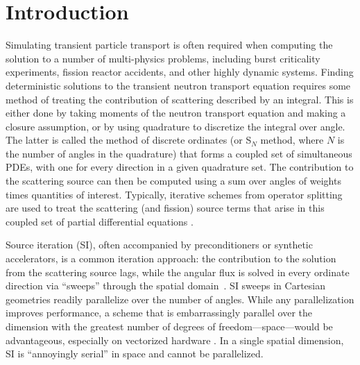 \section{Introduction}




Simulating transient particle transport is often required when computing the solution to a number of multi-physics problems, including burst criticality experiments, fission reactor accidents, and other highly dynamic systems.
Finding deterministic solutions to the transient neutron transport equation requires some method of treating the contribution of scattering described by an integral.
This is either done by taking moments of the neutron transport equation and making a closure assumption, or by using quadrature to discretize the integral over angle.
The latter is called the method of discrete ordinates (or S$_N$ method, where $N$ is the number of angles in the quadrature) that forms a coupled set of simultaneous PDEs, with one for every direction in a given quadrature set.
The contribution to the scattering source can then be computed using a sum over angles of weights times quantities of interest.
Typically, iterative schemes from operator splitting are used to treat the scattering (and fission) source terms that arise in this coupled set of partial differential equations \cite{lewis_computational_1984}.

Source iteration (SI), often accompanied by preconditioners or synthetic accelerators, is a common iteration approach: the contribution to the solution from the scattering source lags, while the angular flux is solved in every ordinate direction via ``sweeps'' through the spatial domain~\cite{adams_subcell_1997}.
SI sweeps in Cartesian geometries readily parallelize over the number of angles.
While any parallelization improves performance, a scheme that is embarrassingly parallel over the dimension with the greatest number of degrees of freedom---space---would be advantageous, especially on vectorized hardware \cite{rosa_cellwise_2013, hoagland_hybrid_2021}.
In a single spatial dimension, SI is ``annoyingly serial'' in space and cannot be parallelized.

